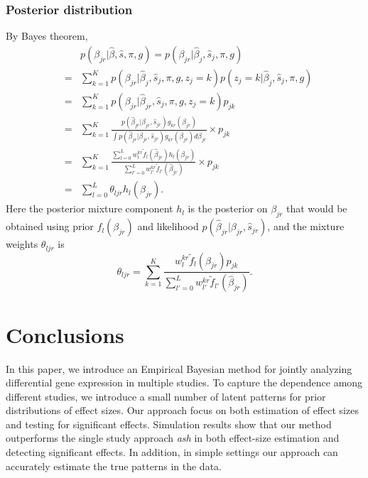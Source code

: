\documentclass[12pt]{article}
\begin{document}
\vspace{5mm}
\subsubsection{Posterior distribution}

\vspace{4mm} By Bayes theorem, 
\begin{eqnarray}
&&p(\beta_{jr}|\hat\beta,\hat s,\pi, g) = p(\beta_{jr}|\hat\beta_{j},\hat s_j,\pi, g)\nonumber \\
&=& \sum_{k=1}^Kp(\beta_{jr}|\hat\beta_{j},\hat s_j,\pi,g,z_j=k)p(z_j=k|\hat\beta_{j},\hat s_j,\pi, g) \nonumber\\
&=& \sum_{k=1}^Kp(\beta_{jr}|\hat\beta_{jr},\hat s_j,\pi,g,z_j=k)p_{jk}\nonumber \\
&=& \sum_{k=1}^K\frac{p(\hat\beta_{jr}|\beta_{jr},\hat s_{jr})g_{kr}(\beta_{jr})}{\int p(\hat\beta_{jr}|\beta_{jr},\hat s_{jr})g_{kr}(\beta_{jr})d\beta_{jr}}\times p_{jk} \nonumber\\
&=& \sum_{k=1}^K \frac{\sum_{l=0}^Lw_l^{kr}\tilde f_{l}(\hat\beta_{jr})h_{l}(\beta_{jr}) }{\sum_{l'=0}^Lw_{l'}^{kr}\tilde f_{l'}(\hat\beta_{jr})} \times p_{jk} \nonumber\\
&=& \sum_{l=0}^L \theta_{ljr}h_{l}(\beta_{jr}). 
\end{eqnarray}
Here the posterior mixture component $h_l$ is the posterior on $\beta_{jr}$ that would be obtained using prior $f_l(\beta_{jr})$ and likelihood $p(\hat\beta_{jr}|\beta_{jr},\hat s_{jr})$, and the mixture weights $\theta_{ljr}$ is
\begin{equation}
     \theta_{ljr} = \sum_{k=1}^K\frac{w_{l}^{kr}\tilde f_{l}(\hat\beta_{jr})p_{jk}}{\sum_{l'=0}^Lw_{l'}^{kr}\tilde f_{l'}(\hat\beta_{jr})}.
\end{equation}

\newpage
\section{Conclusions}

\vspace{4mm} In this paper, we introduce an Empirical Bayesian method for jointly analyzing differential gene expression in multiple studies. To capture the dependence among different studies, we introduce a small number of latent patterns for prior distributions of effect sizes. Our approach focus on both estimation of effect sizes and testing for significant effects. Simulation results show that our method outperforms the single study approach \emph{ash} in both effect-size estimation and detecting significant effects. In addition, in simple settings our approach can accurately estimate the true patterns in the data.
\end{document}
